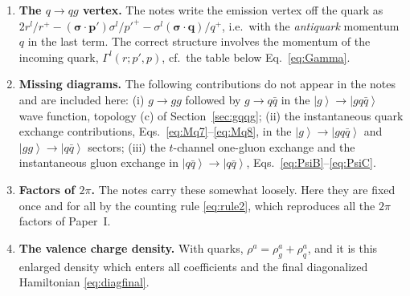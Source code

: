\documentclass[11pt]{article}
\newcommand{\ket}[1]{\left|#1\right\rangle}
\newcommand{\Gam}{\Gamma}
\begin{document}
\begin{enumerate}
\item {\bf The $q\to qg$ vertex.} The notes write the emission vertex off the quark as
$2r^l/r^+-(\bm\sigma\!\cdot\!\bm p')\sigma^l/p'^+-\sigma^l(\bm\sigma\!\cdot\!\bm q)/q^+$, i.e.\ with
the {\em antiquark} momentum $q$ in the last term. The correct structure involves the momentum of
the incoming quark, $\Gam^l(r;p',p)$, cf.\ the table below Eq.~\eqref{eq:Gamma}.

\item {\bf Missing diagrams.} The following contributions do not appear in the notes and are
included here: (i) $g\to gg$ followed by $g\to q\bar q$ in the $\ket{g}\to\ket{gq\bar q}$ wave
function, topology (c) of Section~\ref{sec:gqqg}; (ii) the instantaneous quark exchange
contributions, Eqs.~\eqref{eq:Mq7}--\eqref{eq:Mq8}, in the $\ket{g}\to\ket{gq\bar q}$ and
$\ket{gg}\to\ket{q\bar q}$ sectors; (iii) the $t$-channel one-gluon exchange and the instantaneous
gluon exchange in $\ket{q\bar q}\to\ket{q\bar q}$, Eqs.~\eqref{eq:PsiB}--\eqref{eq:PsiC}.

\item {\bf Factors of $2\pi$.} The notes carry these somewhat loosely. Here they are fixed once and
for all by the counting rule \eqref{eq:rule2}, which reproduces all the $2\pi$ factors of Paper~I.

\item {\bf The valence charge density.} With quarks, $\rho^a=\rho^a_g+\rho^a_q$, and it is this
enlarged density which enters all coefficients and the final diagonalized Hamiltonian
\eqref{eq:diagfinal}.
\end{enumerate}
\end{document}
